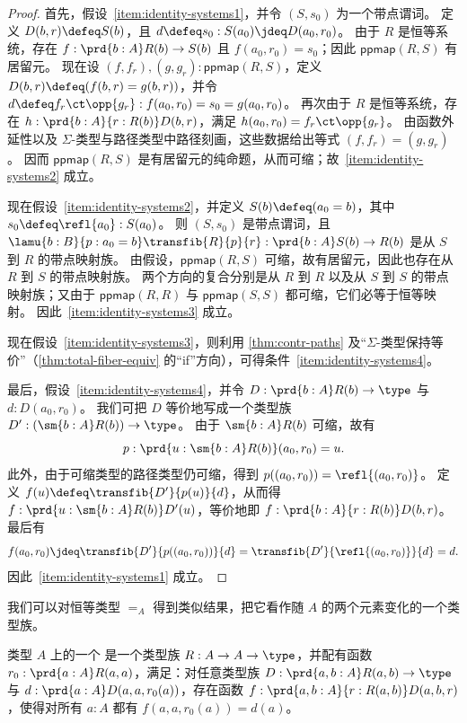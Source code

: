 \begin{proof}
  首先，假设~\ref{item:identity-systems1}，并令 $(S,s_0)$ 为一个带点谓词。
  定义 $D(b,r) \defeq S(b)$，且 $d\defeq s_0: S(a_0) \jdeq D(a_0,r_0)$。
  由于 $R$ 是恒等系统，存在 $f:\prd{b:A} R(b) \to S(b)$ 且 $f(a_0,r_0) = s_0$；因此 $\mathsf{ppmap}(R,S)$ 有居留元。
  现在设 $(f,f_r),(g,g_r) : \mathsf{ppmap}(R,S)$，定义 $D(b,r) \defeq (f(b,r) = g(b,r))$，并令 $d \defeq f_r \ct \opp{g_r} : f(a_0,r_0) = s_0 = g(a_0,r_0)$。
  再次由于 $R$ 是恒等系统，存在 $h:\prd{b:A}{r:R(b)} D(b,r)$，满足 $h(a_0,r_0) = f_r \ct \opp{g_r}$。
  由函数外延性以及 $\Sigma$-类型与路径类型中路径刻画，这些数据给出等式 $(f,f_r) = (g,g_r)$。
  因而 $\mathsf{ppmap}(R,S)$ 是有居留元的纯命题，从而可缩；故~\ref{item:identity-systems2} 成立。

  现在假设~\ref{item:identity-systems2}，并定义 $S(b) \defeq (a_0=b)$，其中 $s_0 \defeq \refl{a_0}:S(a_0)$。
  则 $(S,s_0)$ 是带点谓词，且 $\lamu{b:B}{p:a_0=b} \transfib{R}{p}{r} : \prd{b:A} S(b) \to R(b)$ 是从 $S$ 到 $R$ 的带点映射族。
  由假设，$\mathsf{ppmap}(R,S)$ 可缩，故有居留元，因此也存在从 $R$ 到 $S$ 的带点映射族。
  两个方向的复合分别是从 $R$ 到 $R$ 以及从 $S$ 到 $S$ 的带点映射族；又由于 $\mathsf{ppmap}(R,R)$ 与 $\mathsf{ppmap}(S,S)$ 都可缩，它们必等于恒等映射。
  因此~\ref{item:identity-systems3} 成立。

  现在假设~\ref{item:identity-systems3}，则利用 \cref{thm:contr-paths} 及“$\Sigma$-类型保持等价”（\cref{thm:total-fiber-equiv} 的“if”方向），可得条件~\ref{item:identity-systems4}。

  最后，假设~\ref{item:identity-systems4}，并令 $D:\prd{b:A} R(b)\to  \type$ 与 $d:D(a_0,r_0)$。
  我们可把 $D$ 等价地写成一个类型族 $D':(\sm{b:A} R(b)) \to \type$。
  由于 $\sm{b:A} R(b)$ 可缩，故有
  \[p:\prd{u:\sm{b:A} R(b)} (a_0,r_0) = u. \]
  此外，由于可缩类型的路径类型仍可缩，得到 $p((a_0,r_0)) = \refl{(a_0,r_0)}$。
  定义 $f(u) \defeq \transfib{D'}{p(u)}{d}$，从而得 $f:\prd{u:\sm{b:A} R(b)} D'(u)$，等价地即 $f:\prd{b:A}{r:R(b)} D(b,r)$。
  最后有
  \[f(a_0,r_0) \jdeq \transfib{D'}{p((a_0,r_0))}{d} = \transfib{D'}{\refl{(a_0,r_0)}}{d} = d.\]
  因此~\ref{item:identity-systems1} 成立。
\end{proof}

%

我们可以对恒等类型 $=_A$ 得到类似结果，把它看作随 $A$ 的两个元素变化的一个类型族。

%

\begin{defn}
  类型 $A$ 上的一个 
  是一个类型族 $R:A\to A\to \type$，并配有函数 $r_0:\prd{a:A} R(a,a)$，满足：对任意类型族 $D:\prd{a,b:A} R(a,b) \to \type$ 与 $d:\prd{a:A} D(a,a,r_0(a))$，存在函数 $f:\prd{a,b:A}{r:R(a,b)} D(a,b,r)$，使得对所有 $a:A$ 都有 $f(a,a,r_0(a))=d(a)$。
\end{defn}

